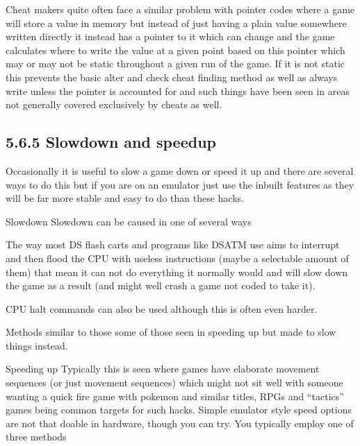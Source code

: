\documentclass[
]{book}
\begin{document}
Cheat makers quite often face a similar problem with pointer codes where a game will store a value in memory but instead of just having a plain value somewhere written directly it instead has a pointer to it which can change and the game calculates where to write the value at a given point based on this pointer which may or may not be static throughout a given run of the game. If it is not static this prevents the basic alter and check cheat finding method as well as always write unless the pointer is accounted for and such things have been seen in areas not generally covered exclusively by cheats as well.

\hypertarget{slowdown-and-speedup}{%
\subsection{5.6.5 Slowdown and speedup}\label{slowdown-and-speedup}}

Occasionally it is useful to slow a game down or speed it up and there are several ways to do this but if you are on an emulator just use the inbuilt features as they will be far more stable and easy to do than these hacks.

Slowdown Slowdown can be caused in one of several ways

The way most DS flash carts and programs like DSATM use aims to interrupt and then flood the CPU with useless instructions (maybe a selectable amount of them) that mean it can not do everything it normally would and will slow down the game as a result (and might well crash a game not coded to take it).

CPU halt commands can also be used although this is often even harder.

Methods similar to those some of those seen in speeding up but made to slow things instead.

Speeding up Typically this is seen where games have elaborate movement sequences (or just movement sequences) which might not sit well with someone wanting a quick fire game with pokemon and similar titles, RPGs and ``tactics'' games being common targets for such hacks. Simple emulator style speed options are not that doable in hardware, though you can try. You typically employ one of three methods
\end{document}
